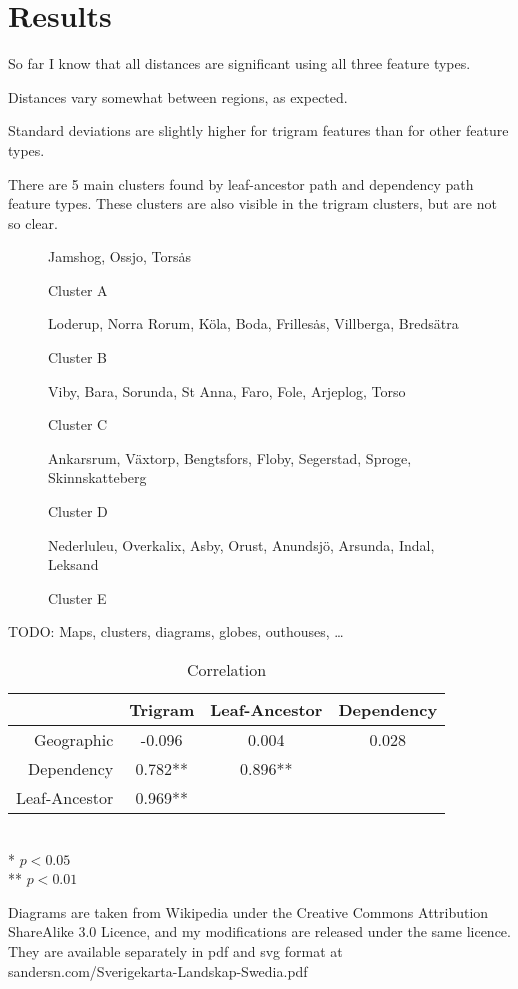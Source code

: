 \chapter{Results}

So far I know that all distances are significant using all three
feature types.

Distances vary somewhat between regions, as expected.

Standard deviations are slightly higher for trigram features than for
other feature types.

There are 5 main clusters found by leaf-ancestor path and dependency
path feature types. These clusters are also visible in the trigram
clusters, but are not so clear.


\begin{figure}
  Jamshog, Ossjo, Tors\.as
\label{cluster-a}
\caption{Cluster A}
\end{figure}

\begin{figure}
  Loderup, Norra Rorum, K\"ola, Boda, Frilles\.as, Villberga,
  Breds\"atra
\label{cluster-b}
\caption{Cluster B}
\end{figure}

\begin{figure}
  Viby, Bara, Sorunda, St Anna, Faro, Fole, Arjeplog, Torso
\label{cluster-c}
\caption{Cluster C}
\end{figure}

\begin{figure}
  Ankarsrum, V\"axtorp, Bengtsfors, Floby, Segerstad, Sproge,
  Skinnskatteberg
\label{cluster-d}
\caption{Cluster D}
\end{figure}

\begin{figure}
  Nederluleu, Overkalix, Asby, Orust, Anundsj\"o, Arsunda, Indal,
  Leksand
\label{cluster-e}
\caption{Cluster E}
\end{figure}

TODO: Maps, clusters, diagrams, globes, outhouses, \ldots
\begin{table}
\begin{tabular}{r|ccc}
  & Trigram & Leaf-Ancestor & Dependency  \\ \hline
  Geographic & -0.096 & 0.004 & 0.028 \\
  Dependency & 0.782** & 0.896** & \\
  Leaf-Ancestor & 0.969** & & \\
\end{tabular} \\
* $ p < 0.05$ \\
** $ p < 0.01$ \\
\label{correlation}
\caption{Correlation}
\end{table}

Diagrams are taken from Wikipedia under the Creative Commons
Attribution ShareAlike 3.0 Licence, and my modifications are released
under the same licence. They are available separately in pdf and svg
format at sandersn.com/Sverigekarta-Landskap-Swedia.pdf
